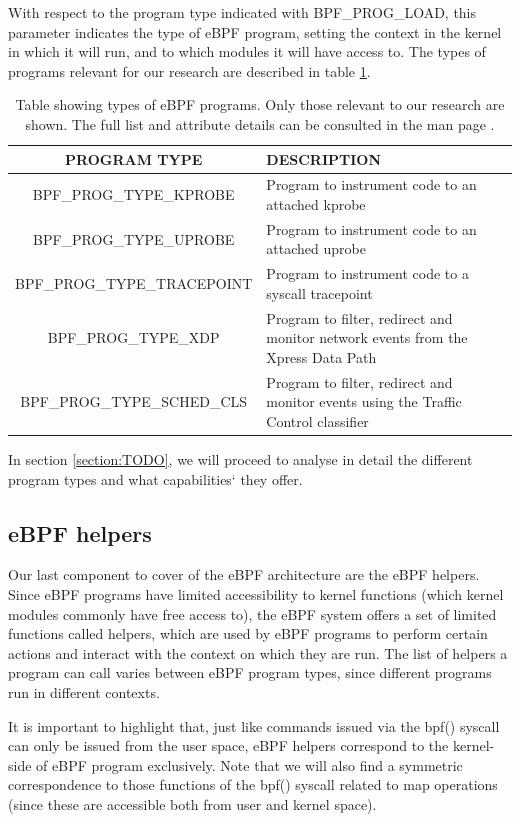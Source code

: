 \documentclass[12pt]{report} %
\begin{document}
With respect to the program type indicated with BPF\_PROG\_LOAD, this parameter indicates the type of eBPF program, setting the context in the kernel in which it will run, and to which modules it will have access to. The types of programs relevant for our research are described in table \ref{table:ebpf_prog_types}.

\begin{table}[H]
\begin{tabular}{|c|>{\centering\arraybackslash}p{5cm}|}
\hline
PROGRAM TYPE & DESCRIPTION\\
\hline
\hline
BPF\_PROG\_TYPE\_KPROBE & Program to instrument code to an attached kprobe\\
\hline
BPF\_PROG\_TYPE\_UPROBE & Program to instrument code to an attached uprobe\\
\hline
BPF\_PROG\_TYPE\_TRACEPOINT & Program to instrument code to a syscall tracepoint\\
\hline
BPF\_PROG\_TYPE\_XDP & Program to filter, redirect and monitor network events from the Xpress Data Path\\
\hline
BPF\_PROG\_TYPE\_SCHED\_CLS & Program to filter, redirect and monitor events using the Traffic Control classifier\\
\hline
\end{tabular}
\caption{Table showing types of eBPF programs. Only those relevant to our research are shown. The full list and attribute details can be consulted in the man page \cite{bpf_syscall}.}
\label{table:ebpf_prog_types}
\end{table}

In section \ref{section:TODO}, we will proceed to analyse in detail the different program types and what capabilities` they offer.

\subsection{eBPF helpers}
Our last component to cover of the eBPF architecture are the eBPF helpers. Since eBPF programs have limited accessibility to kernel functions (which kernel modules commonly have free access to), the eBPF system offers a set of limited functions called helpers\cite{ebpf_helpers}, which are used by eBPF programs to perform certain actions and interact with the context on which they are run. The list of helpers a program can call varies between eBPF program types, since different programs run in different contexts.

It is important to highlight that, just like commands issued via the bpf() syscall can only be issued from the user space, eBPF helpers correspond to the kernel-side of eBPF program exclusively. Note that we will also find a symmetric correspondence to those functions of the bpf() syscall related to map operations (since these are accessible both from user and kernel space).
\end{document}
